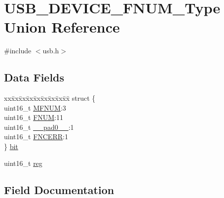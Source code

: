 \hypertarget{union_u_s_b___d_e_v_i_c_e___f_n_u_m___type}{}\section{U\+S\+B\+\_\+\+D\+E\+V\+I\+C\+E\+\_\+\+F\+N\+U\+M\+\_\+\+Type Union Reference}
\label{union_u_s_b___d_e_v_i_c_e___f_n_u_m___type}


{\ttfamily \#include $<$usb.\+h$>$}

\subsection*{Data Fields}
\begin{DoxyCompactItemize}
\item 
\begin{tabbing}
xx\=xx\=xx\=xx\=xx\=xx\=xx\=xx\=xx\=\kill
struct \{\\
\>uint16\_t \mbox{\hyperlink{union_u_s_b___d_e_v_i_c_e___f_n_u_m___type_ae1a283990e0aa3baecda4380fb9bf19e}{MFNUM}}:3\\
\>uint16\_t \mbox{\hyperlink{union_u_s_b___d_e_v_i_c_e___f_n_u_m___type_a7df8ebe952615d830733f3f183d79dc9}{FNUM}}:11\\
\>uint16\_t \mbox{\hyperlink{union_u_s_b___d_e_v_i_c_e___f_n_u_m___type_a77132c2c26a75f5b8751b235cda23828}{\_\_pad0\_\_}}:1\\
\>uint16\_t \mbox{\hyperlink{union_u_s_b___d_e_v_i_c_e___f_n_u_m___type_a3a956bbb04ac866c051cee136dff18c3}{FNCERR}}:1\\
\} \mbox{\hyperlink{union_u_s_b___d_e_v_i_c_e___f_n_u_m___type_a1e9a3ed0199f4932e79600746bcba0fa}{bit}}\\

\end{tabbing}\item 
uint16\+\_\+t \mbox{\hyperlink{union_u_s_b___d_e_v_i_c_e___f_n_u_m___type_a11760f5020019f4aa8cb02e694f7cc44}{reg}}
\end{DoxyCompactItemize}


\subsection{Field Documentation}
\mbox{\label{union_u_s_b___d_e_v_i_c_e___f_n_u_m___type_a77132c2c26a75f5b8751b235cda23828}} 
